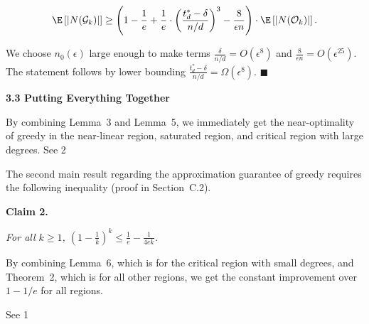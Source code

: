 \documentclass[10pt,a4paper]{article}
\begin{document}
\[\begin{gathered}
\displaystyle\E\left[|N(\mathcal{G}_{k})|\right]\geq\left(1-\frac{1}{e}+\frac{1}{e}\cdot\left(\frac{t^{*}_{d}-\delta}{n/d}\right)^{3}-\frac{8}{\epsilon n}\right)\cdot\E\left[|N(\mathcal{O}_{k})|\right].
\end{gathered}\]


We choose $n_{0}(\epsilon)$ large enough to make terms $\frac{\delta}{n/d}=O(\epsilon^{8})$ and $\frac{8}{\epsilon n}=O(\epsilon^{25})$.
The statement follows by lower bounding $\frac{t^{*}_{d}-\delta}{n/d}=\Omega(\epsilon^{8})$.
\ensuremath{\blacksquare}\par







\par\medskip\noindent\textbf{3.3 Putting Everything Together}\par




By combining Lemma 3 and Lemma 5, we immediately get the near-optimality of greedy in the near-linear region, saturated region, and critical region with large degrees.
See 2\par




The second main result regarding the approximation guarantee of greedy requires the following inequality (proof in Section C.2).\par





\par\medskip\noindent\textbf{\textbf{Claim 2}\textbf{.}}\par



\emph{For all $k\geq 1$, $\left(1-\frac{1}{k}\right)^{k}\leq\frac{1}{e}-\frac{1}{4ek}$.}\par






By combining Lemma 6, which is for the critical region with small degrees, and Theorem 2, which is for all other regions, we get the constant improvement over $1-1/e$ for all regions.\par




See 1\par
\end{document}
